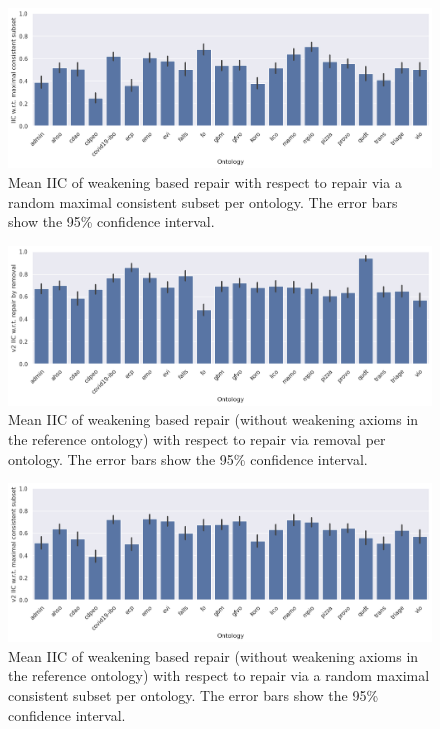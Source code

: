 \begin{figure}[htbp]
  \centering
  \includegraphics[width=\textwidth]{resources/iic-mcs-ontology-bar.png}
  \caption{Mean IIC of weakening based repair with respect to repair via a random maximal consistent subset per ontology. The error bars show the 95\% confidence interval.}
\end{figure}

\begin{figure}[htbp]
  \centering
  \includegraphics[width=\textwidth]{resources/iic-enhance-rem-ontology-bar.png}
  \caption{Mean IIC of weakening based repair (without weakening axioms in the reference ontology) with respect to repair via removal per ontology. The error bars show the 95\% confidence interval.}
\end{figure}

\begin{figure}[htbp]
  \centering
  \includegraphics[width=\textwidth]{resources/iic-enhance-ontology-bar.png}
  \caption{Mean IIC of weakening based repair (without weakening axioms in the reference ontology) with respect to repair via a random maximal consistent subset per ontology. The error bars show the 95\% confidence interval.}
\end{figure}

